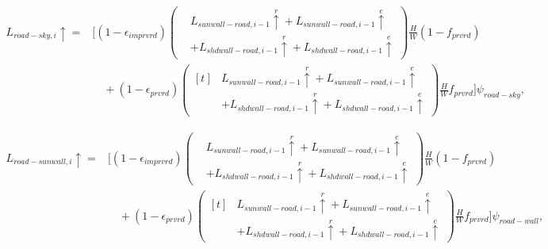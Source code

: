 \documentclass[12pt,authoryear]{elsarticle}
\numberwithin{equation}{section} %
\begin{document}
\begin{equation}
\begin{aligned}
L_{road-sky,i}\uparrow
={}&
\Biggl[(1-\epsilon_{imprvrd})
\left(\begin{aligned}
&L_{sunwall-road,i-1}\overset{r}{\uparrow}
 +L_{sunwall-road,i-1}\overset{e}{\uparrow} \\
&+L_{shdwall-road,i-1}\overset{r}{\uparrow}
 +L_{shdwall-road,i-1}\overset{e}{\uparrow}
\end{aligned}\right)\frac{H}{W}(1-f_{prvrd})\\
&\quad+(1-\epsilon_{prvrd})
\left(\begin{aligned}[t]
 &L_{sunwall-road,i-1}\overset{r}{\uparrow}
 +L_{sunwall-road,i-1}\overset{e}{\uparrow} \\
 &+L_{shdwall-road,i-1}\overset{r}{\uparrow}
 +L_{shdwall-road,i-1}\overset{e}{\uparrow}
\end{aligned}\right)\frac{H}{W}f_{prvrd}\Biggr]\psi_{road-sky},
\end{aligned}
\end{equation}

\begin{equation}
\begin{aligned}
L_{road-sunwall,i}\uparrow
={}&
\Biggl[(1-\epsilon_{imprvrd})
\left(\begin{aligned}
&L_{sunwall-road,i-1}\overset{r}{\uparrow}
 +L_{sunwall-road,i-1}\overset{e}{\uparrow} \\
&+L_{shdwall-road,i-1}\overset{r}{\uparrow}
 +L_{shdwall-road,i-1}\overset{e}{\uparrow}
\end{aligned}\right)\frac{H}{W}(1-f_{prvrd})\\
&\quad+(1-\epsilon_{prvrd})
\left(\begin{aligned}[t]
 &L_{sunwall-road,i-1}\overset{r}{\uparrow}
 +L_{sunwall-road,i-1}\overset{e}{\uparrow} \\
 &+L_{shdwall-road,i-1}\overset{r}{\uparrow}
 +L_{shdwall-road,i-1}\overset{e}{\uparrow}
\end{aligned}\right)\frac{H}{W}f_{prvrd}\Biggr]\psi_{road-wall},
\end{aligned}
\end{equation}
\end{document}
